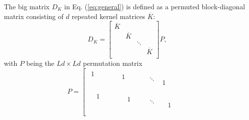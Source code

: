 The big matrix ${D_K}$ in Eq. (\ref{eq:general}) is defined as a permuted block-diagonal matrix consisting of $d$ repeated kernel matrices $\overline{{K}}$:
$$
{D_K} = \left[
\begin{array}{cccc}
\overline{{K}} &  &  &  \\
 & \overline{{K}} &  &  \\
 &  & \ddots &   \\
 &  &  & \overline{{K}}  \\
\end{array}
\right] {P},
$$
with ${P}$ being the $Ld \times Ld$ permutation matrix
$$
{P} = \left[
\begin{array}{c|c|c|c}
\begin{matrix}
1 & & &\\
 & & &\\
 & & &\\
  & & &\\
\end{matrix} &\begin{matrix}
 & & & \\
1 & & &\\
 & & & \\
  & & & \\
\end{matrix}  & \ddots & \begin{matrix}
 & & &\\
 & & &\\
 & & &\\
1 & & &\\
\end{matrix} \\
\hline
\begin{matrix}
 &1 & &\\
 & & &\\
 & & &\\
  & & &\\
\end{matrix} &\begin{matrix}
 & & & \\
 & 1& &\\
 & & & \\
  & & & \\
\end{matrix}  & \ddots & \begin{matrix}
 & & &\\
 & & &\\
 & & &\\
 &1 & &\\
\end{matrix} \\

\end{array}$$
